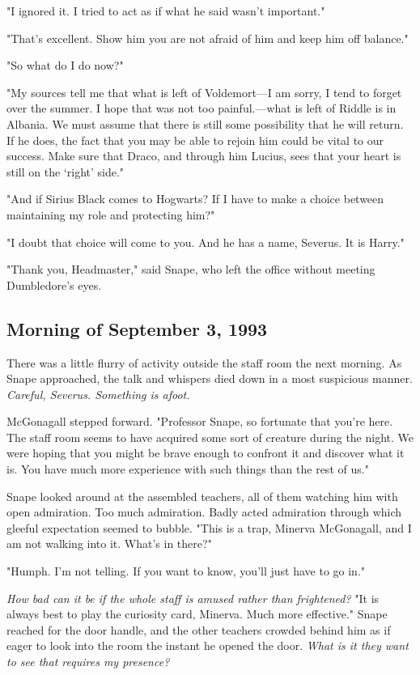 "I ignored it. I tried to act as if what he said wasn't important."

"That's excellent. Show him you are not afraid of him and keep him off balance."

"So what do I do now?"

"My sources tell me that what is left of Voldemort—I am sorry, I tend to forget over the summer. I hope that was not too painful.—what is left of Riddle is in Albania. We must assume that there is still some possibility that he will return. If he does, the fact that you may be able to rejoin him could be vital to our success. Make sure that Draco, and through him Lucius, sees that your heart is still on the `right' side."

"And if Sirius Black comes to Hogwarts? If I have to make a choice between maintaining my role and protecting{\el} him?"

"I doubt that choice will come to you. And he has a name, Severus. It is Harry."

"Thank you, Headmaster," said Snape, who left the office without meeting Dumbledore's eyes.

\subsection{Morning of September 3, 1993} %

There was a little flurry of activity outside the staff room the next morning. As Snape approached, the talk and whispers died down in a most suspicious manner. \emph{Careful, Severus. Something is afoot.}

McGonagall stepped forward. "Professor Snape, so fortunate that you're here. The staff room seems to have acquired some sort of creature during the night. We were hoping that you might be brave enough to confront it and discover what it is. You have much more experience with such things than the rest of us."

Snape looked around at the assembled teachers, all of them watching him with open admiration. Too much admiration. Badly acted admiration through which gleeful expectation seemed to bubble. "This is a trap, Minerva McGonagall, and I am not walking into it. What's in there?"

"Humph. I'm not telling. If you want to know, you'll just have to go in."

\emph{How bad can it be if the whole staff is amused rather than frightened?} "It is always best to play the curiosity card, Minerva. Much more effective." Snape reached for the door handle, and the other teachers crowded behind him as if eager to look into the room the instant he opened the door. \emph{What is it they want to see that requires my presence?}

